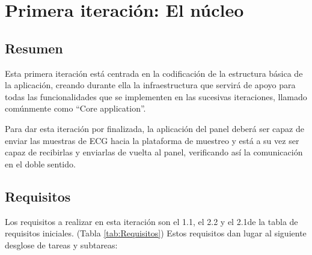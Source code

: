 
\section{Primera iteración: El núcleo}
        \subsection{Resumen}

        Esta primera iteración está centrada en la codificación de la estructura básica de la aplicación, creando durante ella la infraestructura que servirá de apoyo para todas las funcionalidades que se implementen en las sucesivas iteraciones, llamado comúnmente como ``Core application''. 

        Para dar esta iteración por finalizada, la aplicación del panel deberá ser capaz de enviar las muestras de ECG hacia la plataforma de muestreo y está a su vez ser capaz de recibirlas y enviarlas de vuelta al panel, verificando así la comunicación en el doble sentido.

        \subsection{Requisitos}

        Los requisitos a realizar en esta iteración son el 1.1, el  2.2  y el  2.1de la tabla de requisitos iniciales. (Tabla \ref{tab:Requisitos}) Estos requisitos dan lugar al siguiente desglose de tareas y subtareas:

